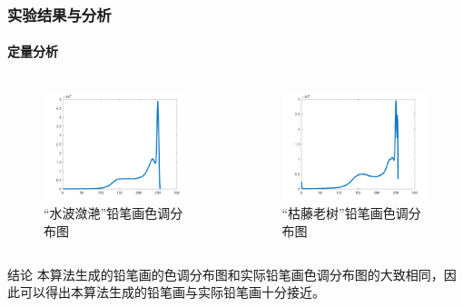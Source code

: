 \documentclass[aspectratio=43, xcolor=svgnames, t, 10pt]{beamer}
\begin{document}
\begin{frame}
  \frametitle{实验结果与分析}
  \framesubtitle{定量分析}
  \begin{columns}
    \begin{column}{0.5\linewidth}
      \begin{figure}
        \includegraphics[width=1\linewidth]{./figure/thesis_hist-01.png}
        \caption{“水波潋滟”铅笔画色调分布图}
      \end{figure}
    \end{column}
    \begin{column}{0.5\linewidth}
      \begin{figure}
        \includegraphics[width=1\linewidth]{./figure/thesis_hist-02.png}
        \caption{“枯藤老树”铅笔画色调分布图}
      \end{figure}
    \end{column}
  \end{columns}

  \begin{block}{结论}
    本算法生成的铅笔画的色调分布图和实际铅笔画色调分布图的大致相同，因此可以得出本算法生成的铅笔画与实际铅笔画十分接近。
  \end{block}
\end{frame}
\end{document}
